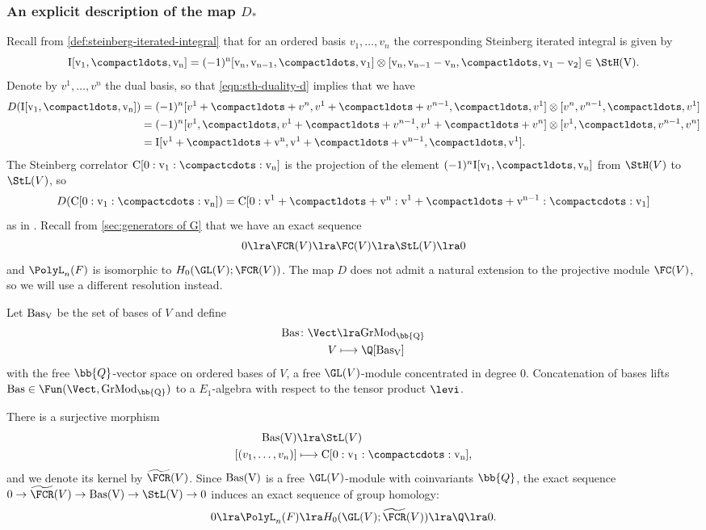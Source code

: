 \documentclass[a4paper]{amsart}
\begin{document}
\subsubsection{An explicit description of the map $D_*$}
Recall from \cref{def:steinberg-iterated-integral} that for an ordered basis $v_1,\dots,v_n$ the corresponding Steinberg iterated integral is given by
\[
\rm{I}[v_1,\compactldots,v_n]=(-1)^n [v_n,v_{n-1},\compactldots,v_1]\otimes [v_n,v_{n-1}-v_n,\compactldots,v_1-v_2]\in \StH(V).
\]
Denote by $v^1,\dots,v^n$ the dual basis, so that \eqref{eqn:sth-duality-d} implies that we have 
\begin{align*}
    D(\rm{I}[v_1,\compactldots,v_n])&=(-1)^n [v^1+\compactldots+v^n,v^1+\compactldots+v^{n-1},\compactldots,v^1]\otimes [v^n,v^{n-1},\compactldots,v^1]\\
    &=(-1)^n [v^1,\compactldots,v^1+\compactldots+v^{n-1}, v^1+\compactldots+v^n]\otimes [v^1,\compactldots,v^{n-1},v^n]\\
    &=\rm{I}[v^1+\compactldots+v^n,v^1+\compactldots+v^{n-1},\compactldots,v^1].
\end{align*}
The Steinberg correlator $\rm{C}[0:v_1:\compactcdots:v_n]$ is the projection of the element $(-1)^n\rm{I}[v_1,\compactldots,v_n]$ from $\StH(V)$ to $\StL(V)$, so
\begin{equation}\label{eqn: duality for correlators}
    D(\rm{C}[0:v_1:\compactcdots:v_n])= \rm{C}[0:v^1+\compactldots+v^n:v^1+\compactldots+v^{n-1}:\compactcdots:v_1]
\end{equation}
as in \cite[Proposition 32]{CMRR24}. Recall from \cref{sec:generators of G} that we have an exact sequence 
\[
0  \lra \FCR(V) \lra  \FC(V) \lra  \StL(V) \lra 0 
\]
and $\PolyL_n(F)$ is isomorphic to $H_0(\GL(V);\FCR(V))$. The map $D$ does not admit a natural extension to the projective module $\FC(V)$, so we will use a different resolution instead. 

Let $\rm{Bas}_V$ be the set of bases of $V$ and define
\begin{align*}\rm{Bas} \colon \Vect &\lra \rm{GrMod}_{\bb{Q}} \\
V &\longmapsto \Q[\rm{Bas}_V]\end{align*}
with the free $\bb{Q}$-vector space on ordered bases of $V$, a free $\GL(V)$-module concentrated in degree $0$. Concatenation of bases lifts $\rm{Bas} \in \Fun(\Vect,\rm{GrMod}_{\bb{Q}})$ to a $E_1$-algebra with respect to the tensor product $\levi$. 

There is a surjective morphism 
\begin{align*}
\rm{Bas}(V) &\lra \StL(V) \\
[(v_1,\dots,v_n)] &\longmapsto \rm{C}[0:v_1:\compactcdots:v_n],\end{align*}
and we denote its kernel by $\widetilde{\FCR}(V)$. Since $\rm{Bas}(V)$ is a free $\GL(V)$-module with coinvariants $\bb{Q}$, the exact sequence $0 \to \widetilde{\FCR}(V) \to \rm{Bas}(V) \to \StL(V) \to 0$ induces an exact sequence of group homology:
\begin{equation} \label{eqn: exact sequence for tilde FR}
    0 \lra \PolyL_n(F)\lra H_0(\GL(V);\widetilde{\FCR}(V)) \lra \Q \lra 0.
\end{equation}
\end{document}
